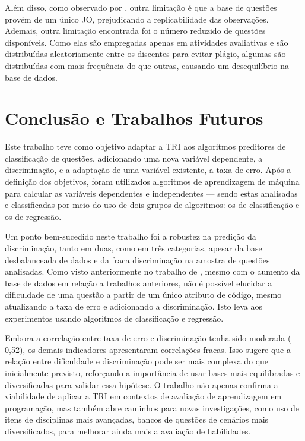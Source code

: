 \documentclass[12pt]{article}
\begin{document}
Além disso, como observado por \cite{elrik2022,jackson2023}, outra limitação é que a base de questões provém de um único JO, prejudicando a replicabilidade das observações. %
Ademais, outra limitação encontrada foi o número reduzido de questões disponíveis. Como elas são empregadas apenas em atividades avaliativas e são distribuídas aleatoriamente entre os discentes para evitar plágio, algumas são distribuídas com mais frequência do que outras, causando um desequilíbrio na base de dados.

\section{Conclusão e Trabalhos Futuros}

Este trabalho teve como objetivo adaptar a TRI aos algoritmos preditores de classificação de questões, adicionando uma nova variável dependente, a discriminação, e a adaptação de uma variável existente, a taxa de erro. Após a definição dos objetivos, foram utilizados algoritmos de aprendizagem de máquina para calcular as variáveis dependentes e independentes --- sendo estas analisadas e classificadas por meio do uso de dois grupos de algoritmos: os de classificação e os de regressão.

Um ponto bem-sucedido neste trabalho foi a robustez na predição da discriminação, tanto em duas, como em três categorias, apesar da base desbalanceada de dados e da fraca discriminação na amostra de questões analisadas. Como visto anteriormente no trabalho de \cite{jackson2023}, mesmo com o aumento da base de dados em relação a trabalhos anteriores, não é possível elucidar a dificuldade de uma questão a partir de um único atributo de código, mesmo atualizando a taxa de erro e adicionando a discriminação. Isto leva aos experimentos usando algoritmos de classificação e regressão.

Embora a correlação entre taxa de erro e discriminação tenha sido moderada ($-$0,52), os demais indicadores apresentaram correlações fracas. Isso sugere que a relação entre dificuldade e discriminação pode ser mais complexa do que inicialmente previsto, reforçando a importância de usar bases mais equilibradas e diversificadas para validar essa hipótese. O trabalho não apenas confirma a viabilidade de aplicar a TRI em contextos de avaliação de aprendizagem em programação, mas também abre caminhos para novas investigações, como uso de itens de disciplinas mais avançadas, bancos de questões de cenários mais diversificados, para melhorar ainda mais a avaliação de habilidades.
\end{document}
